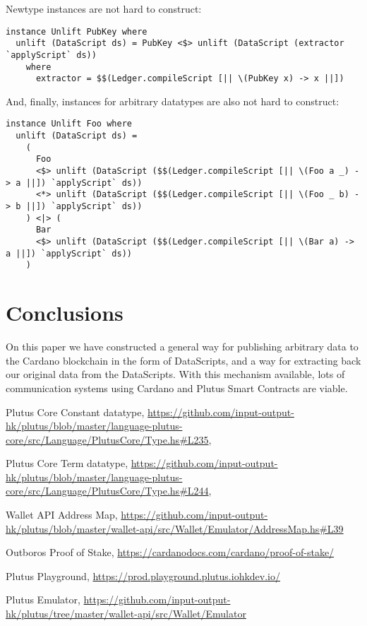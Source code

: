 \documentclass{article}
\begin{document}
Newtype instances are not hard to construct:
\nopagebreak

\begin{verbatim}
instance Unlift PubKey where
  unlift (DataScript ds) = PubKey <$> unlift (DataScript (extractor `applyScript` ds))
    where
      extractor = $$(Ledger.compileScript [|| \(PubKey x) -> x ||])
\end{verbatim}

And, finally, instances for arbitrary datatypes are also not hard to construct:
\nopagebreak

\begin{verbatim}
instance Unlift Foo where
  unlift (DataScript ds) =
    (
      Foo
      <$> unlift (DataScript ($$(Ledger.compileScript [|| \(Foo a _) -> a ||]) `applyScript` ds))
      <*> unlift (DataScript ($$(Ledger.compileScript [|| \(Foo _ b) -> b ||]) `applyScript` ds))
    ) <|> (
      Bar
      <$> unlift (DataScript ($$(Ledger.compileScript [|| \(Bar a) -> a ||]) `applyScript` ds))
    )
\end{verbatim}

\section{Conclusions}

On this paper we have constructed a general way for publishing arbitrary data to the Cardano blockchain in the form of DataScripts, and a way for extracting back our original data from the DataScripts. With this mechanism available, lots of communication systems using Cardano and Plutus Smart Contracts are viable.

\begin{thebibliography}{9}



  Plutus Core Constant datatype,
    \url{https://github.com/input-output-hk/plutus/blob/master/language-plutus-core/src/Language/PlutusCore/Type.hs#L235}, 

  Plutus Core Term datatype,
    \url{ https://github.com/input-output-hk/plutus/blob/master/language-plutus-core/src/Language/PlutusCore/Type.hs#L244}, 

  Wallet API Address Map, \url{https://github.com/input-output-hk/plutus/blob/master/wallet-api/src/Wallet/Emulator/AddressMap.hs#L39}

  Outboros Proof of Stake, \url{https://cardanodocs.com/cardano/proof-of-stake/}

  Plutus Playground, \url{https://prod.playground.plutus.iohkdev.io/}

  Plutus Emulator, \url{https://github.com/input-output-hk/plutus/tree/master/wallet-api/src/Wallet/Emulator}

\end{thebibliography}
\end{document}
